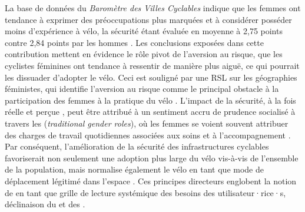 \begin{refsegment}
La base de données du \textsl{Baromètre des Villes Cyclables} indique que les femmes ont tendance à exprimer des préoccupations plus marquées et à considérer posséder moins d'expérience à vélo, la sécurité étant évaluée en moyenne à 2,75 points contre 2,84 points par les hommes \textcolor{blue}{\autocites[25]{vermeulen_barometre_2022}[37]{caduc_analyse_2022}}. Les conclusions exposées dans cette contribution mettent en évidence le rôle pivot de l'aversion au risque, que les cyclistes féminines ont tendance à ressentir de manière plus aiguë, ce qui pourrait les dissuader d'adopter le vélo. Ceci est souligné par une \acrfull{RSL} sur les géographies féministes, qui identifie l'aversion au risque comme le principal obstacle à la participation des femmes à la pratique du vélo \textcolor{blue}{\autocite[4]{ravensbergen_toward_2019}}. L'impact de la sécurité, à la fois réelle et perçue \textcolor{blue}{\autocite[57]{garrard_promoting_2008}}, peut être attribué à un sentiment accru de prudence socialisé à travers les  (\textsl{traditional gender roles}), où les femmes se voient souvent attribuer des charges de travail quotidiennes associées aux soins et à l'accompagnement \textcolor{blue}{\autocite[5]{prati_gender_2019}}. Par conséquent, l'amélioration de la sécurité des infrastructures cyclables favoriserait non seulement une adoption plus large du vélo vis-à-vis de l'ensemble de la population, mais normalise également le vélo en tant que mode de déplacement légitimé dans l'espace \textcolor{blue}{\autocite[40]{aldred_does_2016}}. Ces principes directeurs englobent la notion de  \textcolor{blue}{\autocites[169]{heran_retour_2015}[]{heran_systeme_2001}} en tant que grille de lecture systémique des besoins des utilisateur·rice·s, déclinaison du  \textcolor{blue}{\autocite{hall_impact_1988}} et des  \textcolor{blue}{\autocite[13]{dupuy_dependance_1999}}.%


\end{refsegment}
